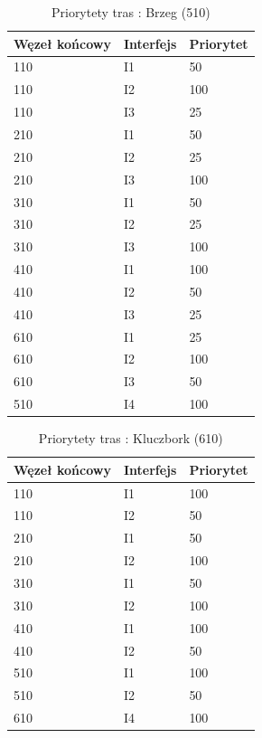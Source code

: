 \documentclass[a4paper]{article}
\begin{document}
\begin{table}[H]
	\centering
	\caption{Priorytety tras : Brzeg (510)}
	\label{xxx}
	\begin{tabular}{lll}
		\hline
		Węzeł końcowy & Interfejs & Priorytet \\
        \hline
		110 & I1 & 50 \\
		110 & I2 & 100 \\
		110 & I3 & 25 \\
        \hline
		210 & I1 & 50 \\
		210 & I2 & 25 \\
		210 & I3 & 100 \\
        \hline
		310 & I1 & 50 \\
		310 & I2 & 25 \\
		310 & I3 & 100 \\
        \hline
		410 & I1 & 100 \\
		410 & I2 & 50 \\
		410 & I3 & 25 \\
        \hline
		610 & I1 & 25 \\
		610 & I2 & 100 \\
		610 & I3 & 50 \\
        \hline
		510 & I4 & 100 \\
	\end{tabular}
\end{table}

\begin{table}[H]
	\centering
	\caption{Priorytety tras : Kluczbork (610)}
	\label{xxx}
	\begin{tabular}{lll}
		\hline
		Węzeł końcowy & Interfejs & Priorytet \\
        \hline
		110 & I1 & 100 \\
		110 & I2 & 50 \\
        \hline
		210 & I1 & 50 \\
		210 & I2 & 100 \\        
        \hline
		310 & I1 & 50 \\
		310 & I2 & 100 \\        
        \hline
		410 & I1 & 100 \\
		410 & I2 & 50 \\
        \hline
		510 & I1 & 100 \\
		510 & I2 & 50 \\
        \hline
		610 & I4 & 100 \\
	\end{tabular}
\end{table}	
\end{document}
